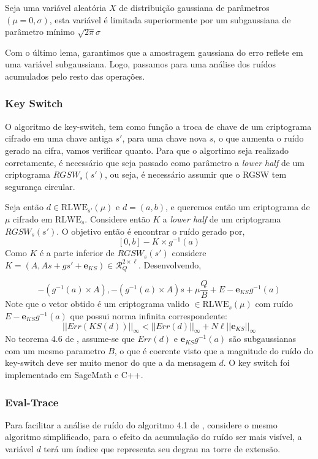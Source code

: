 \begin{lemma}
    Seja uma variável aleatória $X$ de distribuição gaussiana de parâmetros $(\mu = 0, \sigma)$, esta variável é limitada superiormente
    por um subgaussiana de parâmetro mínimo $\sqrt{2\pi}\sigma$
\end{lemma}

Com o último lema, garantimos que a amostragem gaussiana do erro reflete em uma variável subgaussiana. Logo, passamos para uma análise dos ruídos acumulados pelo resto das operações.

\subsubsection{Key Switch}
O algoritmo de key-switch, tem como função a troca de chave de um criptograma cifrado
em uma chave antiga $s'$, para uma chave nova $s$, o que aumenta o ruído gerado na cifra, vamos verificar quanto.
Para que o algortimo seja realizado corretamente, é necessário 
que seja passado como parâmetro a \textit{lower half} de um criptograma $RGSW_s(s')$, ou seja, é necessário assumir 
que o RGSW tem segurança circular.

Seja então $d \in \text{RLWE}_{s'}(\mu)$ e $d = (a, b)$, e queremos então um criptograma de $\mu$ cifrado em $\text{RLWE}_{s}$.
Considere então $K$ a \textit{lower half} de um criptograma $RGSW_s(s')$. O objetivo então é encontrar o ruído gerado por, 
$$
[0,b] - K \times g^{-1}(a)
$$
Como $K$ é a parte inferior de $RGSW_s(s')$ considere $K = (A, As + gs' + \mathbf{e}_{KS}) \in \mathcal{R}_Q^{2 \times \ell}$. Desenvolvendo,

$$
-(g^{-1}(a) \times A), -(g^{-1}(a) \times A) s + \mu \frac{Q}{B} + E - \mathbf{e}_{KS} g^{-1}(a)
$$
Note que o vetor obtido é um criptograma valido $\in \text{RLWE}_{s}(\mu)$ com ruído 
$E - \mathbf{e}_{KS} g^{-1}(a)$ que possui norma infinita correspondente:
$$
||Err(KS(d))||_\infty < ||Err(d)||_\infty + N\ell ||\mathbf{e}_{KS}||_\infty
$$
No teorema 4.6 de \cite{lw23I}, assume-se que $Err(d)$ e $\mathbf{e}_{KS} g^{-1}(a)$ são subgaussianas com um mesmo parametro $B$, o que é coerente visto que a magnitude do ruído do key-switch deve ser muito menor do que a da mensagem $d$. O key switch foi implementado em SageMath e C++.

\subsubsection{Eval-Trace}

Para facilitar a análise de ruído do algoritmo 4.1 de \cite{lw23I}, considere o mesmo
algoritmo simplificado, para o efeito da acumulação do ruído ser mais visível, a variável $d$ terá um 
índice que representa seu degrau na torre de extensão. 

